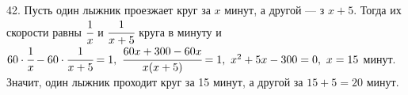 42. Пусть один лыжник проезжает круг за $x$ минут, а другой --- з $x+5.$ Тогда их скорости равны $\cfrac{1}{x}$ и $\cfrac{1}{x+5}$ круга в минуту и $60\cdot\cfrac{1}{x}-60\cdot\cfrac{1}{x+5}=1,\ \cfrac{60x+300-60x}{x(x+5)}=1,\ x^2+5x-300=0,\ x=15$ минут. Значит, один лыжник проходит круг за 15 минут, а другой за $15+5=20$ минут.\\
